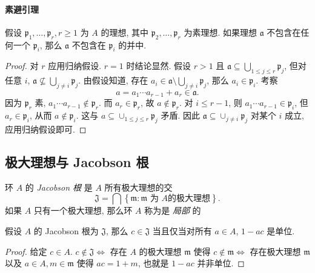 \paragraph{素避引理}

\begin{proposition}[素避]
  假设 \( \mathfrak{p}_1, \ldots, \mathfrak{p}_r, r \geq 1 \) 为 \( A \) 的理想,
  其中 \( \mathfrak{p}_2, \ldots, \mathfrak{p}_r \) 为素理想. 如果理想 \(
  \mathfrak{a} \) 不包含在任何一个 \( \mathfrak{p}_i \), 那么 \( \mathfrak{a} \)
  不包含在 \( \mathfrak{p}_i \) 的并中.
\end{proposition}
\begin{proof}
  对 \( r \) 应用归纳假设.
  \( r = 1 \) 时结论显然.
  假设 \( r > 1 \) 且 \( \mathfrak{a} \subseteq \bigcup_{1 \leq j \leq r}
  \mathfrak{p}_j \), 但对任意 \( i \), \( \mathfrak{a} \not\subseteq \bigcup_{j
  \neq i}\mathfrak{p}_j \).
  由假设知道,
  存在 \( a_i \in \mathfrak{a} \setminus \bigcup_{j \neq i} \mathfrak{p}_j \),
  那么 \( a_i \in \mathfrak{p}_i \). 考察
  \[
    a = a_1 \cdots a_{r - 1} + a_r \in \mathfrak{a}.
  \]
  因为 \( \mathfrak{p}_r \) 素, \( a_1 \cdots a_{r - 1} \notin \mathfrak{p}_r
  \). 而 \( a_{r} \in \mathfrak{p}_r \), 故 \( a \notin \mathfrak{p}_r \).
  对 \( i \leq r - 1 \), 则 \( a_1 \cdots a_{r - 1} \in \mathfrak{p}_{i} \), 但
  \( a_r \in \mathfrak{p}_i \), 从而 \( a \notin \mathfrak{p}_i \). 这与 \( a
  \subseteq \cup_{1 \leq j \leq r} \mathfrak{p}_j \) 矛盾.
  因此 \( \mathfrak{a} \subseteq \cup_{j \neq i} \mathfrak{p}_j \) 对某个 \( i
  \) 成立, 应用归纳假设即可.
\end{proof}

\subsection{极大理想与 Jacobson 根}

环 \( A \) 的 \emph{Jacobson 根} 是 \( A \) 所有极大理想的交
\[
  \mathfrak{J} = \bigcap \left\lbrace \mathfrak{m}: \mathfrak{m} \text{ 为 } A
  \text{的极大理想} \right\rbrace.
\]
如果 \( A \) 只有一个极大理想, 那么环 \( A \) 称为是 \emph{局部} 的

\begin{proposition}
  假设 \( A \) 的 Jacobson 根为 \( \mathfrak{J} \), 那么 \( c \in \mathfrak{J}
  \) 当且仅当对所有 \( a \in A \), \( 1 - ac \) 是单位.
\end{proposition}
\begin{proof}
  给定 \( c \in A \).
  \( c \notin \mathfrak{J} \iff \) 存在 \( A \) 的极大理想 \( \mathfrak{m} \)
  使得 \( c \notin \mathfrak{m} \iff \) 存在极大理想 \( \mathfrak{m} \) 以及 \(
  a \in A, m \in \mathfrak{m} \) 使得 \( ac = 1 + m \), 也就是 \( 1 - ac \)
  并非单位.
\end{proof}

